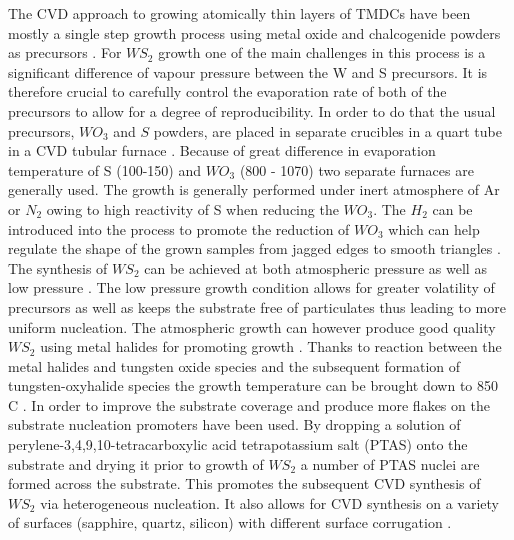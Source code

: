The CVD approach to growing atomically thin layers of TMDCs have been mostly a single step growth process using metal oxide and chalcogenide powders as precursors \cite{Reale2016}\cite{doi:10.1021/nn4046002}\cite{Cong2013}\cite{Rong2014}\cite{Dumcenco2015}\cite{Lee2012}\cite{Ling2014}\cite{Najmaei2013}\cite{Ji2013}\cite{Zhang2014a}\cite{Yu2013}. For $WS_2$ growth one of the main challenges in this process is a significant difference of vapour pressure between the W and S precursors. It is therefore crucial to carefully control the evaporation rate of both of the precursors to allow for a degree of reproducibility. In order to do that the usual precursors, $WO_3$ and $S$ powders, are placed in separate crucibles in a quart tube in a CVD tubular furnace \cite{Bosi2015}\cite{Shi2015}. Because of great difference in evaporation temperature of S (100-150{\degree}) and $WO_3$ (800 - 1070{\degree}) two separate furnaces are generally used. The growth is generally performed under inert atmosphere of Ar or $N_2$ owing to high reactivity of S when reducing the $WO_3$. The $H_2$ can be introduced into the process to promote the reduction of $WO_3$ which can help regulate the shape of the grown samples from jagged edges to smooth triangles \cite{doi:10.1021/nn403454e}. The synthesis of $WS_2$ can be achieved at both atmospheric pressure as well as low pressure \cite{Bosi2015}\cite{Shi2015}. The low pressure growth condition allows for greater volatility of precursors as well as keeps the substrate free of particulates thus leading to more uniform nucleation. The atmospheric growth can however produce good quality $WS_2$ using metal halides for promoting growth \cite{Li2015}. Thanks to reaction between the metal halides and tungsten oxide species and the subsequent formation of tungsten-oxyhalide species the growth temperature can be brought down to 850 {\degree}C \cite{Li2015}. In order to improve the substrate coverage and produce more flakes on the substrate nucleation promoters have been used. By dropping a solution of perylene-3,4,9,10-tetracarboxylic acid tetrapotassium salt (PTAS) onto the substrate and drying it prior to growth of $WS_2$ a number of PTAS nuclei are formed across the substrate. This promotes the subsequent CVD synthesis of $WS_2$ via heterogeneous nucleation. It also allows for CVD synthesis on a variety of surfaces (sapphire, quartz, silicon) with different surface corrugation \cite{Lee2013}.